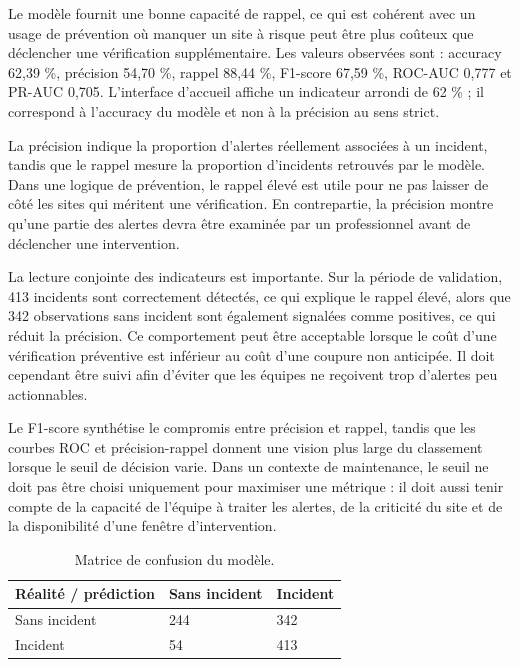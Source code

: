 \documentclass[12pt,a4paper,oneside]{report}
\begin{document}
Le modèle fournit une bonne capacité de rappel, ce qui est cohérent avec un usage de prévention où manquer un site à risque peut être plus coûteux que déclencher une vérification supplémentaire. Les valeurs observées sont : accuracy 62,39 \%, précision 54,70 \%, rappel 88,44 \%, F1-score 67,59 \%, ROC-AUC 0,777 et PR-AUC 0,705. L’interface d’accueil affiche un indicateur arrondi de 62 \% ; il correspond à l’accuracy du modèle et non à la précision au sens strict.

La précision indique la proportion d’alertes réellement associées à un incident, tandis que le rappel mesure la proportion d’incidents retrouvés par le modèle. Dans une logique de prévention, le rappel élevé est utile pour ne pas laisser de côté les sites qui méritent une vérification. En contrepartie, la précision montre qu’une partie des alertes devra être examinée par un professionnel avant de déclencher une intervention.

La lecture conjointe des indicateurs est importante. Sur la période de validation, 413 incidents sont correctement détectés, ce qui explique le rappel élevé, alors que 342 observations sans incident sont également signalées comme positives, ce qui réduit la précision. Ce comportement peut être acceptable lorsque le coût d’une vérification préventive est inférieur au coût d’une coupure non anticipée. Il doit cependant être suivi afin d’éviter que les équipes ne reçoivent trop d’alertes peu actionnables.

Le F1-score synthétise le compromis entre précision et rappel, tandis que les courbes ROC et précision-rappel donnent une vision plus large du classement lorsque le seuil de décision varie. Dans un contexte de maintenance, le seuil ne doit pas être choisi uniquement pour maximiser une métrique : il doit aussi tenir compte de la capacité de l’équipe à traiter les alertes, de la criticité du site et de la disponibilité d’une fenêtre d’intervention.

\begin{table}[H]
\centering
\small
\caption{Matrice de confusion du modèle.}
\begin{tabularx}{\textwidth}{B{4.0cm} P{5.0cm} X}
\toprule
Réalité / prédiction & Sans incident & Incident\\
\midrule
Sans incident & 244 & 342\\
Incident & 54 & 413\\
\bottomrule
\end{tabularx}
\end{table}
\end{document}
